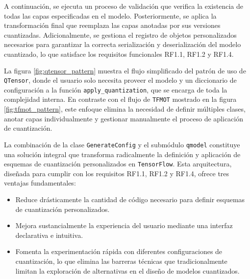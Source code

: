 A continuación, se ejecuta un proceso de validación que verifica la existencia de todas las capas especificadas en el modelo. Posteriormente, se aplica la transformación final que reemplaza las capas anotadas por sus versiones cuantizadas. Adicionalmente, se gestiona el registro de objetos personalizados \cite{tensorflow_custom_object_scope} necesarios para garantizar la correcta serialización y deserialización del modelo cuantizado, lo que satisface los requisitos funcionales RF1.1, RF1.2 y RF1.4.

La figura \ref{fig:qtensor_pattern} muestra el flujo simplificado del patrón de uso de \texttt{QTensor}, donde el usuario solo necesita proveer el modelo y un diccionario de configuración a la función \texttt{apply\_quantization}, que se encarga de toda la complejidad interna. En contraste con el flujo de \texttt{TFMOT} mostrado en la figura \ref{fig:tfmot_pattern}, este enfoque elimina la necesidad de definir múltiples clases, anotar capas individualmente y gestionar manualmente el proceso de aplicación de cuantización.


La combinación de la clase \texttt{GenerateConfig} y el submódulo \texttt{qmodel} constituye una solución integral que transforma radicalmente la definición y aplicación de esquemas de cuantización personalizados en \texttt{TensorFlow}. Esta arquitectura, diseñada para cumplir con los requisitos RF1.1, RF1.2 y RF1.4, ofrece tres ventajas fundamentales:

\begin{itemize}
    \item Reduce drásticamente la cantidad de código necesario para definir esquemas de cuantización personalizados.
    \item Mejora sustancialmente la experiencia del usuario mediante una interfaz declarativa e intuitiva.
    \item Fomenta la experimentación rápida con diferentes configuraciones de cuantización, lo que elimina las barreras técnicas que tradicionalmente limitan la exploración de alternativas en el diseño de modelos cuantizados.
\end{itemize}
